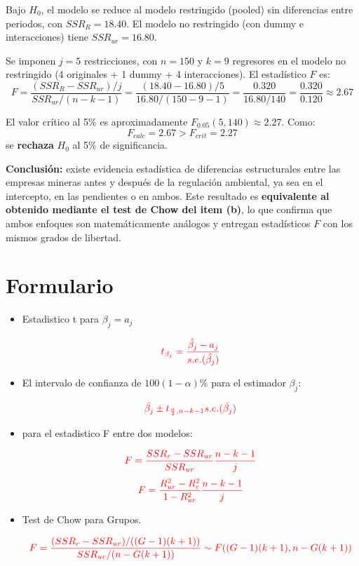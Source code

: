 \documentclass[10pt,a4paper]{article}
\begin{document}
\begin{enumerate}
\begin{enumerate}
Bajo $H_0$, el modelo se reduce al modelo restringido (pooled) sin diferencias entre periodos, con $SSR_R = 18.40$. El modelo no restringido (con dummy e interacciones) tiene $SSR_{ur} = 16.80$.

Se imponen $j = 5$ restricciones, con $n = 150$ y $k = 9$ regresores en el modelo no restringido (4 originales + 1 dummy + 4 interacciones). El estadístico $F$ es:
\[
F = \frac{(SSR_R - SSR_{ur})/j}{SSR_{ur}/(n - k - 1)} = \frac{(18.40 - 16.80)/5}{16.80/(150 - 9 - 1)} = \frac{0.320}{16.80/140} = \frac{0.320}{0.120} \approx 2.67
\]

El valor crítico al 5\% es aproximadamente $F_{0.05}(5, 140) \approx 2.27$. Como:
\[
F_{calc} = 2.67 > F_{crit} = 2.27
\]
se \textbf{rechaza} $H_0$ al 5\% de significancia.

\textbf{Conclusión:} existe evidencia estadística de diferencias estructurales entre las empresas mineras antes y después de la regulación ambiental, ya sea en el intercepto, en las pendientes o en ambos. Este resultado es \textbf{equivalente al obtenido mediante el test de Chow del item (b)}, lo que confirma que ambos enfoques son matemáticamente análogos y entregan estadísticos $F$ con los mismos grados de libertad.
\end{enumerate}


\newpage
\section*{Formulario}
\begin{itemize}

\item Estadistico t para $\beta_j = a_j$

$$\color{red}{t_{\beta_j}=\frac{\hat{\beta_j}-a_j}{s.e.(\hat{\beta_j})}}$$

\item El intervalo de confianza de $100(1-\alpha)\%$ para el estimador $\beta_j$:

$${\color{red}\hat{\beta_j} \pm t_{\frac{\alpha}{2},n-k-1}s.e.(\hat{\beta_j})}$$


\item para el estadistico F entre dos modelos:

$$\color{red}{F=\frac{SSR_r-SSR_{ur}}{SSR_{ur}}\frac{n-k-1}{j}}$$
$$\color{red}{F=\frac{R^2_{ur}-R^2_{r}}{1-R^2_{ur}}\frac{n-k-1}{j}}$$

\item Test de Chow para Grupos.

    \[\color{red}
    F = \frac{(SSR_r - SSR_{ur}) / ((G - 1)(k + 1))}{SSR_{ur} / (n - G(k + 1))} \sim F((G - 1)(k + 1), n - G(k + 1))
    \]


\end{itemize}
\end{enumerate}
\end{document}
